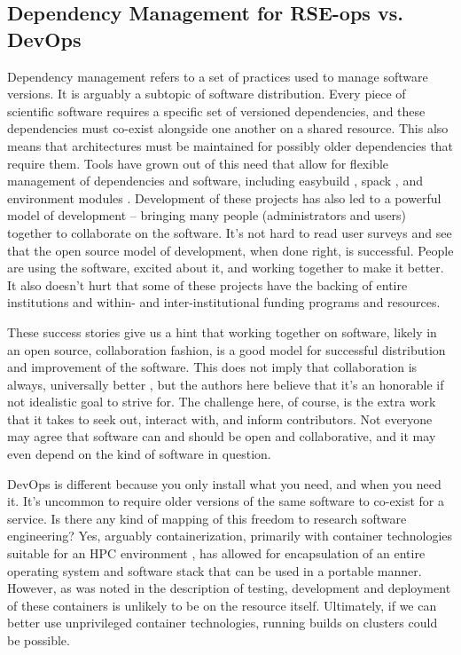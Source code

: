 \subsection{Dependency Management for RSE-ops vs. DevOps}

Dependency management refers to a set of practices used to manage software versions. It is arguably a subtopic of software distribution. Every piece of scientific software requires a specific set of versioned dependencies, and these dependencies must co-exist alongside one another on a shared resource. This also means that architectures must be maintained for possibly older dependencies that require them. Tools have grown out of this need that allow for flexible management of dependencies and software, including easybuild \cite{easybuild}, spack \cite{spack}, and environment modules \cite{LMOD,environment-modules}. Development of these projects has also led to a powerful model of development -- bringing many people (administrators and users) together to collaborate on the software. It's not hard to read user surveys \cite{spack-user-survey} and see that the open source model of development, when done right, is successful. People are using the software, excited about it, and working together to make it better. It also doesn't hurt that some of these projects have the backing of entire institutions and within- and inter-institutional funding programs and resources.

These success stories give us a hint that working together on software, likely in an open source, collaboration fashion, is a good model for successful distribution and improvement of the software.
This does not imply that collaboration is always, universally better \cite{noauthor_undated-bo}, but the authors here believe that it's an honorable if not idealistic goal to strive for.
The challenge here, of course, is the extra work that it takes to seek out, interact with, and inform contributors. Not everyone may agree that software can and should be open and collaborative, and it may even depend on the kind of software in question.

DevOps is different because you only install what you need, and when you need it.
It's uncommon to require older versions of the same software to co-exist for a service. Is there any kind of mapping of this freedom to research software engineering? Yes, arguably containerization, primarily with container technologies suitable for an HPC environment \cite{singularity,charlie,shifter}, has allowed for encapsulation of an entire operating system and software stack that can be used in a portable manner. However, as was noted in the description of testing, development and deployment of these containers is unlikely to be on the resource itself. Ultimately, if we can better use unprivileged container technologies, running builds on clusters could be possible.


